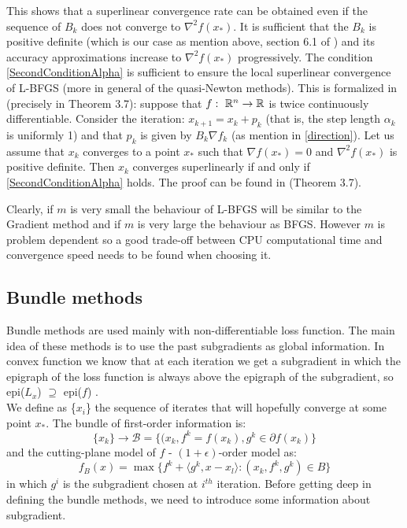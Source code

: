 This shows that a superlinear convergence rate can be obtained even if the sequence of $B_{k}$ does not converge to $\nabla^2f(x_*)$. It is sufficient that the $B_{k}$ is positive definite (which is our case as mention above, section 6.1 of \cite{numerical}) and its accuracy approximations increase to $\nabla^2f(x_*)$ progressively. The condition \ref{SecondConditionAlpha} is sufficient to ensure the local superlinear convergence of L-BFGS (more in general of the quasi-Newton methods). This is formalized in \cite{numerical} (precisely in Theorem 3.7):
suppose that $f: \textnormal{ }\mathbb{R}^n \rightarrow \mathbb{R}$ is twice continuously differentiable. Consider the iteration: $x_{k+1}=x_{k} + p_{k}$ (that is, the step length $\alpha_{k}$ is uniformly 1) and that $p_{k}$ is given by $B_{k}\nabla f_{k}$ (as mention in \ref{direction}). Let us assume that $x_{k}$ converges to a point $x_{*}$ such that $\nabla f(x_{*}) = 0$ and $\nabla^2f(x_{*})$ is positive definite. Then $x_{k}$ converges superlinearly if and only if \ref{SecondConditionAlpha} holds. The proof can be found in \cite{numerical} (Theorem 3.7). 

Clearly, if $m$ is very small the behaviour of L-BFGS will be similar to the Gradient method and if $m$ is very large the behaviour as BFGS. However $m$ is problem dependent so a good trade-off between CPU computational time and convergence speed needs to be found when choosing it.

\subsection{Bundle methods}
\label{Bundle-methods}
Bundle methods are used mainly with non-differentiable loss function. The main idea of these methods is to use the past subgradients as global information. In convex function we know that at each iteration we get a subgradient in which the epigraph of the loss function is always above the epigraph of the subgradient, so epi($L_x$) $ \supseteq $ epi($f$) .\\ 
We define as \{$x_i$\} the sequence of iterates that will hopefully converge at some point $x_*$. 
The bundle of first-order information is:
\begin{equation}
\{x_{k}\}\rightarrow \mathcal{B}=\{(x_{k}, f^k=f(x_{k}), g^{k} \in \partial f(x_{k})\}
\end{equation}
and the cutting-plane model of $f$ - $(1 +\epsilon)$-order model as:
\begin{equation}
\label{CP-model}
f_B(x) = \max{\{f^k+ \langle g^k,x - x_l \rangle:  (x_k,f^k,g^k)\in B\}}
\end{equation}
in which $g^i$ is the subgradient chosen at $i^{th}$ iteration.
Before getting deep in defining the bundle methods, we need to introduce some information about subgradient.
